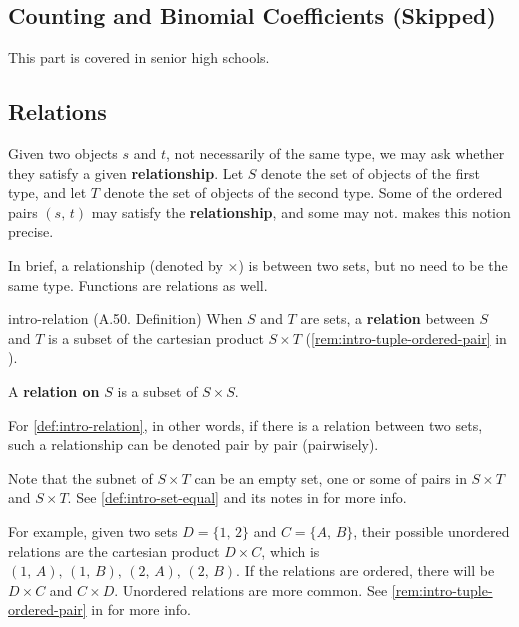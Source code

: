 \documentclass[../src/handouts/main.tex]{subfiles}
\begin{document}
\label{subsec:intro-function-end}

\subsection{Counting and Binomial Coefficients (Skipped)}

This part is covered in senior high schools.

\subsection{Relations}

Given two objects $s$ and $t$, not necessarily of the same type, we may ask whether they satisfy a given \textbf{relationship}.
Let $S$ denote the set of objects of the first type, and let $T$ denote the set of objects of the second type.
Some of the ordered pairs $(s,\, t)$ may satisfy the \textbf{relationship}, and some may not.
 makes this notion precise.

In brief, a relationship (denoted by $\times$) is between two sets, but no need to be the same type. Functions are relations as well.

\begin{definition}{}{intro-relation}
  (A.50. Definition)
  When $S$ and $T$ are sets, a \textbf{relation} between $S$ and $T$ is a subset of the cartesian product $S \times T$ (\cref{rem:intro-tuple-ordered-pair} in ).

  A \textbf{relation on} $S$ is a subset of $S \times S$.
\end{definition}

For \cref{def:intro-relation}, in other words, if there is a relation between two sets, such a relationship can be denoted pair by pair (pairwisely).

Note that the subnet of $S \times T$ can be an empty set, one or some of pairs in $S \times T$ and $S \times T$. See \cref{def:intro-set-equal} and its notes in  for more info.

For example, given two sets $D = \{ 1,\, 2\}$ and $C = \{ A,\, B \}$, their possible unordered relations are the cartesian product $D \times C$, which is $(1,\, A),\, (1,\, B),\, (2,\, A),\, (2,\, B)$. If the relations are ordered, there will be $D \times C$ and $C \times D$. Unordered relations are more common. See \cref{rem:intro-tuple-ordered-pair} in  for more info.
\end{document}
